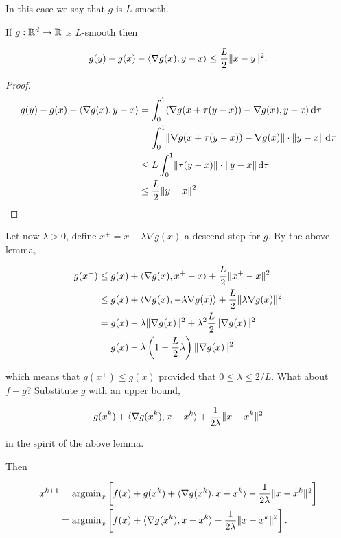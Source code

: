 In this case we say that $g$ is $L$-smooth.

\begin{lemma}
    
    If $g : \mathbb{R}^d \to \mathbb{R}$ is $L$-smooth then

    \[ g(y) - g(x) - \langle \nabla g(x), y - x \rangle \le \frac{L}{2} \lVert x  - y \rVert^2. \]

\end{lemma}

\begin{proof}
    
    \begin{align*}
        g(y) - g(x) - \langle \nabla g(x), y - x \rangle &= \int_0^1 \langle \nabla g(x + \tau(y-x)) - \nabla g(x), y - x \rangle \, \mathrm{d} \tau \\
        &= \int_0^1 \lVert \nabla g(x + \tau(y-x)) - \nabla g(x) \rVert \cdot \lVert y-x \rVert\, \mathrm{d} \tau \\
        &\le L \int_0^1 \lVert \tau (y-x) \rVert \cdot \lVert y-x \rVert\, \mathrm{d} \tau \\
        &\le \frac{L}{2} \lVert y-x \rVert^2
    \end{align*}

\end{proof}

Let now $\lambda > 0$, define $x^+ = x - \lambda \nabla g(x)$ a descend step for $g$. By the above lemma, 

\begin{align}
    g(x^+) &\le g(x) + \langle \nabla g(x), x^+ - x \rangle + \frac{L}{2}\lVert x^+ - x \rVert^2 \\
    &\le g(x) + \langle \nabla g(x) ,  -\lambda \nabla g(x)\rangle + \frac{L}{2} \lVert \lambda \nabla g(x) \rVert^2 \\
    &= g(x) -\lambda \lVert \nabla g(x) \rVert^2 + \lambda^2 \frac{L}{2} \lVert \nabla g(x) \rVert^2  \\
    &= g(x) - \lambda \left(1-\frac{L}{2}\lambda\right) \lVert \nabla g(x) \rVert^2
\end{align}

which means that $g(x^+) \le g(x)$ provided that $0 \le \lambda \le 2/L$. What about $f + g$? Substitute $g$ with an upper bound, 

\[ g(x^k) + \langle \nabla g(x^k), x - x^k\rangle + \frac{1}{2\lambda} \lVert x - x^k \rVert^2\]

in the spirit of the above lemma.

Then 

\begin{align*}
    x^{k+1} &= \mathrm{argmin}_x \left[ f(x) + g(x^k) + \langle \nabla g(x^k), x - x^k \rangle - \frac{1}{2\lambda} \lVert x - x^k \rVert^2 \right] \\
    &= \mathrm{argmin}_x \left[ f(x) + \langle \nabla g(x^k), x - x^k \rangle - \frac{1}{2\lambda} \lVert x - x^k \rVert^2 \right].
\end{align*}


